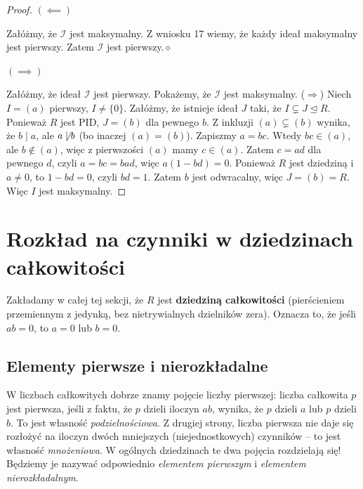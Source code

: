 \begin{proof}
\noindent
\noindent $\left(\impliedby \right) $ 

Załóżmy, że $\mathcal{I}$ jest maksymalny. Z wniosku 17 wiemy, że każdy ideał maksymalny jest pierwszy. Zatem $\mathcal{I}$ jest pierwszy.$\diamond $

\noindent $\left( \implies \right) $

Załóżmy, że ideał $\mathcal{I}$ jest pierwszy. Pokażemy, że $\mathcal{I}$ jest maksymalny. 
($\Rightarrow$) Niech $I = (a)$ pierwszy, $I \neq \{0\}$. Załóżmy, że istnieje ideał $J$ taki, że $I \subsetneq J \trianglelefteq R$. Ponieważ $R$ jest PID, $J = (b)$ dla pewnego $b$. Z inkluzji $(a) \subsetneq (b)$ wynika, że $b \mid a$, ale $a \not\mid b$ (bo inaczej $(a) = (b)$). Zapiszmy $a = bc$. Wtedy $bc \in (a)$, ale $b \notin (a)$, więc z pierwszości $(a)$ mamy $c \in (a)$. Zatem $c = ad$ dla pewnego $d$, czyli $a = bc = bad$, więc $a(1 - bd) = 0$. Ponieważ $R$ jest dziedziną i $a \neq 0$, to $1 - bd = 0$, czyli $bd = 1$. Zatem $b$ jest odwracalny, więc $J = (b) = R$. Więc $I$ jest maksymalny.
\end{proof}
\section{Rozkład na czynniki w dziedzinach całkowitości}

\begin{context}
Zakładamy w całej tej sekcji, że $R$ jest \textbf{dziedziną całkowitości} (pierścieniem przemiennym z jedynką, bez nietrywialnych dzielników zera). Oznacza to, że jeśli $ab = 0$, to $a=0$ lub $b=0$.
\end{context}

\subsection*{Elementy pierwsze i nierozkładalne}

\begin{intuition}
W liczbach całkowitych dobrze znamy pojęcie liczby pierwszej: liczba całkowita $p$ jest pierwsza, jeśli z faktu, że $p$ dzieli iloczyn $ab$, wynika, że $p$ dzieli $a$ lub $p$ dzieli $b$. To jest własność \emph{podzielnościowa}. Z drugiej strony, liczba pierwsza nie daje się rozłożyć na iloczyn dwóch mniejszych (niejednostkowych) czynników – to jest własność \emph{mnożeniowa}. W ogólnych dziedzinach te dwa pojęcia rozdzielają się! Będziemy je nazywać odpowiednio \emph{elementem pierwszym} i \emph{elementem nierozkładalnym}.
\end{intuition}

